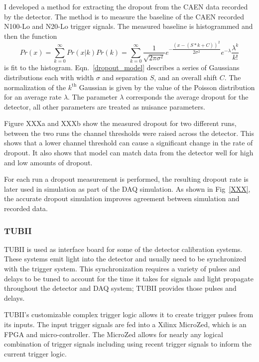 I developed a method for extracting the dropout from the CAEN data
recorded by the detector.
The method is to measure the baseline of the CAEN recorded N100-Lo and N20-Lo
trigger signals.
The measured baseline is histogrammed and then the function
\begin{equation}
    Pr(x) = \sum_{k=0}^{\infty} Pr(x | k)Pr(k) = \sum_{k=0}^{\infty} \dfrac{1}{\sqrt{2 \pi \sigma^2}} e^{-\dfrac{(x - (S*k + C))^2}{2 \sigma^2}} e^{-\lambda}\dfrac{\lambda^{k}}{k!}
    \label{dropout_model}
\end{equation}
is fit to the histogram. Eqn.~\ref{dropout_model} describes a series of Gaussians
distributions each with width $\sigma$ and separation $S$, and an overall shift $C$.
The normalization of the $k^{\text{th}}$ Gaussian is given by the value of the Poisson
distribution for an average rate $\lambda$.
The parameter $\lambda$ corresponds the average dropout for the detector, all
other parameters are treated as nuisance parameters.

Figure XXXa and XXXb show the measured dropout for two different runs, between
the two runs the channel thresholds were raised across the detector. This shows
that a lower channel threshold can cause a significant change in the rate of
dropout. It also shows that model can match data from the detector well for high
and low amounts of dropout.

For each run a dropout measurement is performed, the resulting dropout rate
is later used in simulation as part of the DAQ simulation.
As shown in Fig~\ref{XXX}, the accurate dropout simulation improves agreement between simulation and recorded
data.


\subsubsection{TUBII}
\label{sec:tubii}
TUBII is used as interface board for some of the detector calibration systems.
These systems emit light into the detector and usually need to be
synchronized with the trigger system. This synchronization requires
a variety of pulses and delays to be tuned to account for the time it
takes for signals and light propagate throughout the detector and DAQ
system; TUBII provides those pulses and delays.

TUBII's customizable complex trigger logic
allows it to create trigger pulses from its inputs.
The input trigger signals are fed into a Xilinx MicroZed, which is an FPGA and
micro-controller.
The MicroZed allows for nearly any logical combination of trigger signals including
using recent trigger signals to inform the current trigger logic.


